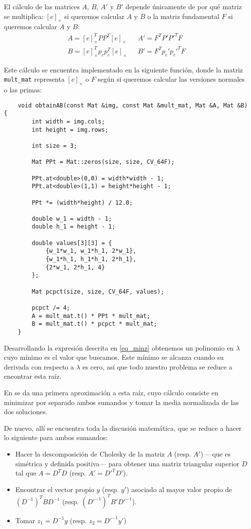 \documentclass[a4paper, 11pt]{article}
\theoremstyle{definition}
\begin{document}
    El cálculo de las matrices $A$, $B$, $A'$ y $B'$ depende únicamente de por qué matriz se multiplica: $[e]_\times$ si queremos calcular $A$ y $B$ o la matriz fundamental $F$ si queremos calcular $A$ y $B$:
    \begin{align*}
        A = [e]_\times^T P P^T [e]_\times && A' = F^T P' P'^T F \\
        B = [e]_\times^T p_c p_c^T [e]_\times && B' = F^T p_c' p_c'^T F
    \end{align*}

    Este cálculo se encuentra implementado en la siguiente función, donde la matriz \lstinline{mult_mat} representa $[e]_\times$ o $F$ según si queremos calcular las versiones normales o las primas:
    \begin{lstlisting}
    void obtainAB(const Mat &img, const Mat &mult_mat, Mat &A, Mat &B){
        int width = img.cols;
        int height = img.rows;

        int size = 3;

        Mat PPt = Mat::zeros(size, size, CV_64F);

        PPt.at<double>(0,0) = width*width - 1;
        PPt.at<double>(1,1) = height*height - 1;

        PPt *= (width*height) / 12.0;

        double w_1 = width - 1;
        double h_1 = height - 1;

        double values[3][3] = {
            {w_1*w_1, w_1*h_1, 2*w_1},
            {w_1*h_1, h_1*h_1, 2*h_1},
            {2*w_1, 2*h_1, 4}
        };

        Mat pcpct(size, size, CV_64F, values);

        pcpct /= 4;
        A = mult_mat.t() * PPt * mult_mat;
        B = mult_mat.t() * pcpct * mult_mat;
    }
    \end{lstlisting}

    Desarrollando la expresión descrita en \ref{eq_minz} obtenemos un polinomio en $\lambda$ cuyo mínimo es el valor que buscamos. Este mínimo se alcanza cuando su derivada con respecto a $\lambda$ es cero, así que todo nuestro problema se reduce a encontrar esta raíz.

    En \cite{LoopZhang} se da una primera aproximación a esta raíz, cuyo cálculo consiste en minimizar por separado ambos sumandos y tomar la media normalizada de las dos soluciones.

    De nuevo, allí se encuentra toda la discusión matemática, que se reduce a hacer lo siguiente para ambos sumandos:
    \begin{itemize}
        \item Hacer la descomposición de Cholesky de la matriz $A$ (resp. $A'$) ---que es simétrica y definida positiva--- para obtener una matriz triangular superior $D$ tal que $A = D^TD$  (resp. $A' = D'^TD'$).
        \item Encontrar el vector propio $y$ (resp. $y'$) asociado al mayor valor propio de $(D^{-1})^T B D^{-1}$ (resp. $(D'^{-1})^T B' D'^{-1}$).
        \item Tomar $z_1 = D^{-1}y$ (resp. $z_2 = D'^{-1}y'$)
    \end{itemize}
\end{document}
